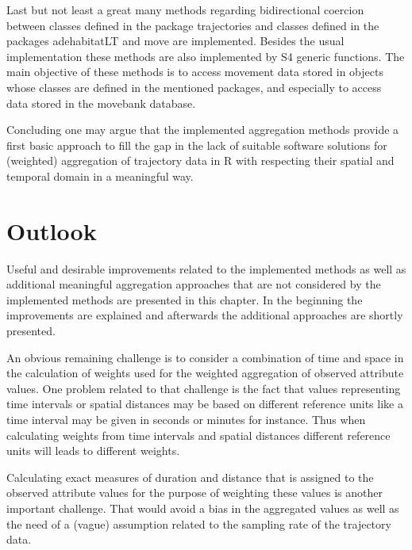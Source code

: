 \documentclass[12pt, oneside, a4paper]{scrbook}
\newcommand{\pkg}[1]{{\normalfont\fontseries{b}\selectfont #1}}
\let\proglang=\textsf
\begin{document}
Last but not least a great many methods regarding bidirectional coercion between classes defined
in the package \pkg{trajectories} and classes defined in the packages \pkg{adehabitatLT} and \pkg{move} are implemented. Besides the usual implementation these methods are also implemented by S4 generic functions. The main objective of these methods is to access movement data stored in objects whose classes are defined in the mentioned packages, and especially to access data stored in the movebank database.
\par\medskip

Concluding one may argue that the implemented aggregation methods provide a first basic approach to fill the gap in the lack of suitable software solutions for (weighted) aggregation of trajectory data in \proglang{R} with respecting their spatial and temporal domain in a meaningful way.




\chapter{Outlook}
\label{chap:outlook}
Useful and desirable improvements related to the implemented methods as well as additional meaningful aggregation approaches that are not considered by the implemented methods are presented in this chapter.
In the beginning the improvements are explained and afterwards the additional approaches are shortly presented.
\par\medskip

An obvious remaining challenge is to consider a combination of time and space in the calculation of weights used for the weighted aggregation of observed attribute values. 
One problem related to that challenge is the fact that values representing time intervals or spatial distances may be based on different reference units like a time interval may be given in seconds or minutes for instance. 
Thus when calculating weights from time intervals and spatial distances different reference units will leads to different weights.
\par\medskip

Calculating exact measures of duration and distance that is assigned to the observed attribute values for the purpose of weighting these values is another important challenge.
That would avoid a bias in the aggregated values as well as the need of a (vague) assumption related to the sampling rate of the trajectory data.
\par\medskip
\end{document}
